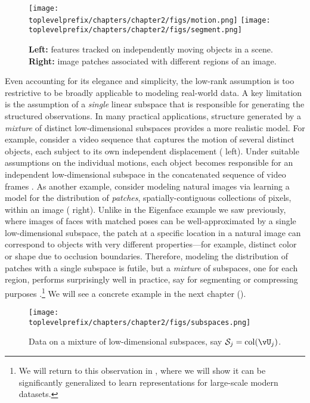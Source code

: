 \documentclass[../../book-main.tex]{subfiles}
\begin{document}
\begin{figure}
    \centering
    \texttt{[image: \\toplevelprefix/chapters/chapter2/figs/motion.png]} \hspace{5mm}
    \texttt{[image: \\toplevelprefix/chapters/chapter2/figs/segment.png]} 
    \caption{\textbf{Left:} features tracked on independently moving objects in a scene. \textbf{Right:} image patches associated with different regions of an image.}
    \label{fig:multiple-subspaces}
\end{figure}
Even accounting for its elegance and simplicity, the low-rank assumption is too restrictive to be broadly applicable to modeling real-world data. 
A key limitation is the assumption of a \textit{single} linear subspace that is responsible for generating the structured observations.
In many practical applications, structure generated by a \textit{mixture} of
distinct low-dimensional subspaces provides a more realistic model.
For example, consider a video sequence that captures the motion of several distinct objects, each subject to its own independent displacement ( left). 
Under suitable assumptions on the individual motions, each object becomes responsible for an independent low-dimensional subspace in the concatenated sequence of video frames \cite{VidalR2004-ECCV}.
As another example, consider modeling natural images via learning a model for
the distribution of \textit{patches}, spatially-contiguous collections of
pixels, within an image ( right). Unlike in
the Eigenface example we saw previously, where images of faces with matched
poses can be well-approximated by a single low-dimensional subspace, the patch
at a specific location in a natural image can correspond to objects with very
different properties---for example, distinct color or shape due to occlusion
boundaries. Therefore, modeling the distribution of patches with a single
subspace is futile, but a \textit{mixture} of subspaces, one for each region,
performs surprisingly well in practice, say for segmenting or compressing
purposes \cite{Mobahi-IJCV2011}.\footnote{We will return to this observation in
, where we will show it can be significantly
generalized to learn representations for large-scale modern datasets.} We will see a concrete example in the next chapter ().



\begin{figure}
    \centering
    \texttt{[image: \\toplevelprefix/chapters/chapter2/figs/subspaces.png]}
    \caption{Data on a mixture of low-dimensional subspaces, say $\mathcal{S}_j
    = \mathop{\mathrm{col}}(\vU_j)$.}
    \label{fig:subspaces}
\end{figure}
\end{document}
